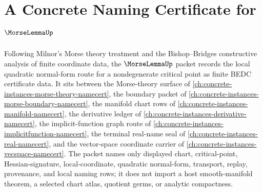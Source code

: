 \chapter{A Concrete Naming Certificate for $\MorseLemmaUp$}
\label{ch:concrete-instances-morse-lemma-namecert}

Following Milnor's Morse theory treatment and the Bishop--Bridges constructive analysis of finite coordinate data, the $\MorseLemmaUp$ packet records the local quadratic normal-form route for a nondegenerate critical point as finite BEDC certificate data. It sits between the Morse-theory surface of \autoref{ch:concrete-instances-morse-theory-namecert}, the boundary packet of \autoref{ch:concrete-instances-morse-boundary-namecert}, the manifold chart rows of \autoref{ch:concrete-instances-manifold-namecert}, the derivative ledger of \autoref{ch:concrete-instances-derivative-namecert}, the implicit-function graph route of \autoref{ch:concrete-instances-implicitfunction-namecert}, the terminal real-name seal of \autoref{ch:concrete-instances-real-namecert}, and the vector-space coordinate carrier of \autoref{ch:concrete-instances-vecspace-namecert}. The packet names only displayed chart, critical-point, Hessian-signature, local-coordinate, quadratic normal-form, transport, replay, provenance, and local naming rows; it does not import a host smooth-manifold theorem, a selected chart atlas, quotient germs, or analytic compactness.

